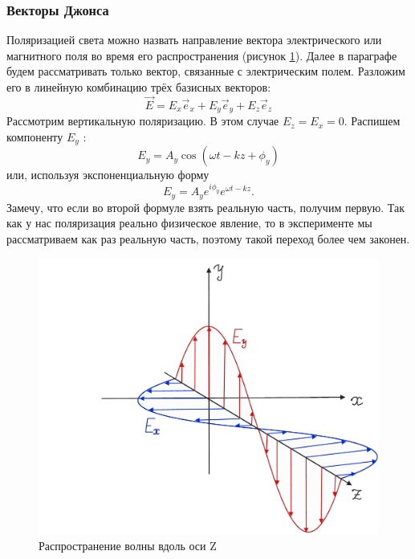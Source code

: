 \subsubsection{Векторы Джонса}
Поляризацией света можно назвать направление вектора электрического или магнитного поля во время его распространения (рисунок \ref{fig B.4}). Далее в параграфе будем рассматривать только вектор, связанные с электрическим полем. Разложим его в линейную комбинацию трёх базисных векторов:
\[
\Vec{E} = E_x \Vec{e}_x + E_y \Vec{e}_y + E_z \Vec{e}_z
\]
Рассмотрим вертикальную поляризацию. В этом случае $E_z = E_x = 0$. Распишем компоненту $E_y$ :
\[
E_y = A_y \cos(\omega t - kz + \phi_y)
\]
или, используя экспоненциальную форму
\[
E_y = A_y e^{i\phi_y}e^{\omega t - kz}.
\]
Замечу, что если во второй формуле взять реальную часть, получим первую. Так как у нас поляризация реально физическое явление, то в эксперименте мы рассматриваем как раз реальную часть, поэтому такой переход более чем законен.
\begin{figure}[h!]
\centering
\includegraphics[scale=0.23]{appendix/images/polarization.png}
\caption{Распространение волны вдоль оси Z}
\label{fig B.4}
\end{figure}

